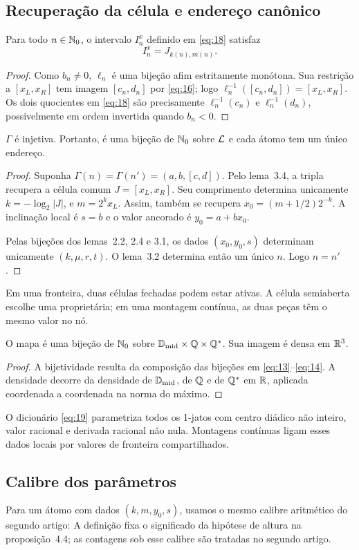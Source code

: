 \subsection{Recuperação da célula e endereço canônico}
\begin{lema}
Para todo $n\in\mathbb N_0$, o intervalo $I_n^x$ definido em \eqref{eq:18} satisfaz
\[
I_n^x=J_{k(n),m(n)}.
\]
\end{lema}
\begin{proof}
Como $b_n\ne0$, $\ell_n$ é uma bijeção afim estritamente monótona. Sua restrição a $[x_L,x_R]$ tem imagem $[c_n,d_n]$ por \eqref{eq:16}; logo $\ell_n^{-1}([c_n,d_n])=[x_L,x_R]$. Os dois quocientes em \eqref{eq:18} são precisamente $\ell_n^{-1}(c_n)$ e $\ell_n^{-1}(d_n)$, possivelmente em ordem invertida quando $b_n<0$.
\end{proof}
\begin{teorema}
$\Gamma$ é injetiva. Portanto, é uma bijeção de $\mathbb N_0$ sobre $\mathcal L$ e cada átomo tem um único endereço.
\end{teorema}
\begin{proof}
Suponha $\Gamma(n)=\Gamma(n')=(a,b,[c,d])$. Pelo lema~3.4, a tripla recupera a célula comum $J=[x_L,x_R]$. Seu comprimento determina unicamente $k=-\log_2|J|$, e $m=2^kx_L$. Assim, também se recupera $x_0=(m+1/2)2^{-k}$. A inclinação local é $s=b$ e o valor ancorado é $y_0=a+bx_0$.

Pelas bijeções dos lemas~2.2, 2.4 e 3.1, os dados $(x_0,y_0,s)$ determinam unicamente $(k,\mu,r,t)$. O lema~3.2 determina então um único $n$. Logo $n=n'$.
\end{proof}
Em uma fronteira, duas células fechadas podem estar ativas. A célula semiaberta escolhe uma proprietária; em uma montagem contínua, as duas peças têm o mesmo valor no nó.
\begin{teorema}
O mapa
é uma bijeção de $\mathbb N_0$ sobre $\mathbb D_{\rm mid}\times\mathbb Q\times\mathbb Q^*$. Sua imagem é densa em $\mathbb R^3$.
\end{teorema}
\begin{proof}
A bijetividade resulta da composição das bijeções em \eqref{eq:13}--\eqref{eq:14}. A densidade decorre da densidade de $\mathbb D_{\rm mid}$, de $\mathbb Q$ e de $\mathbb Q^*$ em $\mathbb R$, aplicada coordenada a coordenada na norma do máximo.
\end{proof}
O dicionário \eqref{eq:19} parametriza todos os 1-jatos com centro diádico não inteiro, valor racional e derivada racional não nula. Montagens contínuas ligam esses dados locais por valores de fronteira compartilhados.

\subsection{Calibre dos parâmetros}
Para um átomo com dados $(k,m,y_0,s)$, usamos o mesmo calibre aritmético do segundo artigo:
A definição fixa o significado da hipótese de altura na proposição~4.4; as contagens sob esse calibre são tratadas no segundo artigo.
